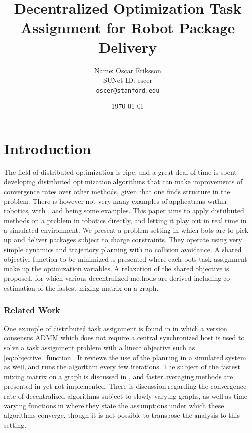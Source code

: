 \documentclass{article}
\title{{\large \bf Decentralized Optimization Task Assignment for Robot Package Delivery}}
\author{Name: Oscar Eriksson \\ SUNet ID: oscer \\ \texttt{oscer@stanford.edu}}
\date{\monthyeardate\today}
\newcommand{\sectiontype}{}
\begin{document}
\maketitle
\section*{Introduction}
\renewcommand{\sectiontype}{Introduction}
The field of distributed optimization is ripe, and a great deal of time is spent developing distributed optimization algorithms that can make improvements of convergence rates over other methods, given that one finds structure in the problem. There is however not very many examples of applications within robotics, with \cite{haksar2022consensus}, \cite{shorinwa2020distributed} and \cite{jadbabaie2003coordination} being some examples. This paper aims to apply distributed methods on a problem in robotics directly, and letting it play out in real time in a simulated environment. We present a problem setting in which bots are to pick up and deliver packages subject to charge constraints. They operate using very simple dynamics and trajectory planning with no collision avoidance. A shared objective function to be minimized is presented where each bots task assignment make up the optimization variables. A relaxation of the shared objective is proposed, for which various decentralized methods are derived including co-estimation of the fastest mixing matrix on a graph.

\subsubsection*{Related Work}
One example of distributed task assignment is found in \cite{shorinwa2023distributed} in which a version consensus ADMM which does not require a central synchronized host is used to solve a task assignment problem with a linear objective such as \eqref{eq:objective_function}. It reviews the use of the planning in a simulated system as well, and runs the algorithm every few iterations.
The subject of the fastest mixing matrix on a graph is discussed in \cite{xiao2004fast}, and faster averaging methods are presented in \cite{johansson2008faster} yet not implemented. There is discussion regarding the convergence rate of decentralized algorithms subject to slowly varying graphs, as well as time varying functions in \cite{rogozin2019optimal} where they state the assumptions under which these algorithms converge, though it is not possible to transpose the analysis to this setting.
\end{document}
